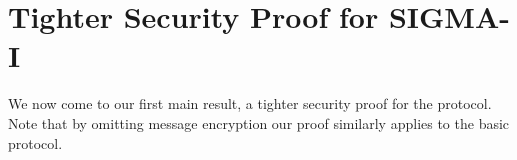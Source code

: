 \section{Tighter Security Proof for SIGMA-I}
\label{sec:sigma-proof}

We now come to our first main result, a tighter security proof for the \SIGMAI protocol.
Note that by omitting message encryption our proof similarly applies to the basic \SIGMA protocol.


